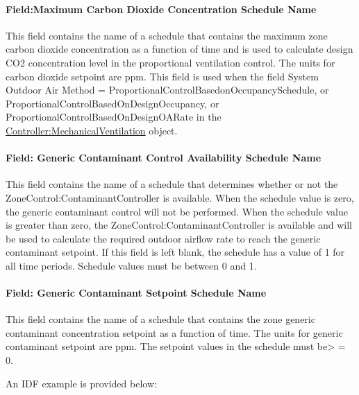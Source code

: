 \paragraph{Field:Maximum Carbon Dioxide Concentration Schedule Name}\label{fieldmaximum-carbon-dioxide-concentration-schedule-name}

This field contains the name of a schedule that contains the maximum zone carbon dioxide concentration as a function of time and is used to calculate design CO2 concentration level in the proportional ventilation control. The units for carbon dioxide setpoint are ppm. This field is used when the field System Outdoor Air Method = ProportionalControlBasedonOccupancySchedule, or ProportionalControlBasedOnDesignOccupancy, or ProportionalControlBasedOnDesignOARate in the \hyperref[controllermechanicalventilation]{Controller:MechanicalVentilation} object.

\paragraph{Field: Generic Contaminant Control Availability Schedule Name}\label{field-generic-contaminant-control-availability-schedule-name}

This field contains the name of a schedule that determines whether or not the ZoneControl:ContaminantController is available. When the schedule value is zero, the generic contaminant control will not be performed. When the schedule value is greater than zero, the ZoneControl:ContaminantController is available and will be used to calculate the required outdoor airflow rate to reach the generic contaminant setpoint. If this field is left blank, the schedule has a value of 1 for all time periods. Schedule values must be between 0 and 1.

\paragraph{Field: Generic Contaminant Setpoint Schedule Name}\label{field-generic-contaminant-setpoint-schedule-name}

This field contains the name of a schedule that contains the zone generic contaminant concentration setpoint as a function of time. The units for generic contaminant setpoint are ppm. The setpoint values in the schedule must be\textgreater{} = 0.

An IDF example is provided below:

